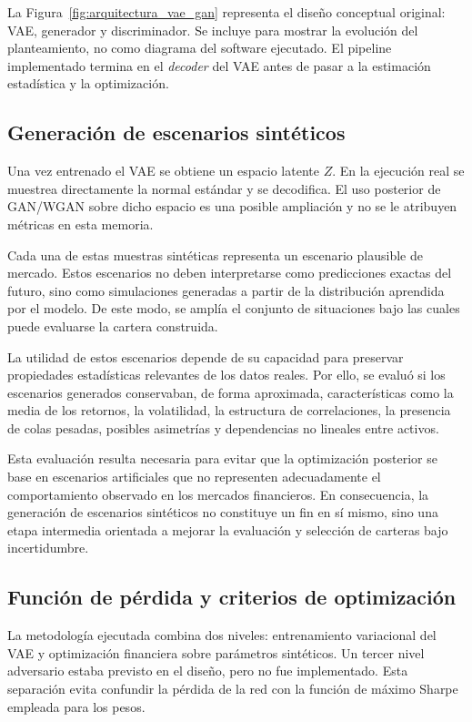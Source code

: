 La Figura~\ref{fig:arquitectura_vae_gan} representa el diseño conceptual original: VAE, generador y discriminador. Se incluye para mostrar la evolución del planteamiento, no como diagrama del software ejecutado. El pipeline implementado termina en el \textit{decoder} del VAE antes de pasar a la estimación estadística y la optimización.

\subsection{Generación de escenarios sintéticos}

Una vez entrenado el VAE se obtiene un espacio latente $Z$. En la ejecución real se muestrea directamente la normal estándar y se decodifica. El uso posterior de GAN/WGAN sobre dicho espacio es una posible ampliación y no se le atribuyen métricas en esta memoria.

Cada una de estas muestras sintéticas representa un escenario plausible de mercado. Estos escenarios no deben interpretarse como predicciones exactas del futuro, sino como simulaciones generadas a partir de la distribución aprendida por el modelo. De este modo, se amplía el conjunto de situaciones bajo las cuales puede evaluarse la cartera construida.

La utilidad de estos escenarios depende de su capacidad para preservar propiedades estadísticas relevantes de los datos reales. Por ello, se evaluó si los escenarios generados conservaban, de forma aproximada, características como la media de los retornos, la volatilidad, la estructura de correlaciones, la presencia de colas pesadas, posibles asimetrías y dependencias no lineales entre activos.

Esta evaluación resulta necesaria para evitar que la optimización posterior se base en escenarios artificiales que no representen adecuadamente el comportamiento observado en los mercados financieros. En consecuencia, la generación de escenarios sintéticos no constituye un fin en sí mismo, sino una etapa intermedia orientada a mejorar la evaluación y selección de carteras bajo incertidumbre.

\subsection{Función de pérdida y criterios de optimización}

La metodología ejecutada combina dos niveles: entrenamiento variacional del VAE y optimización financiera sobre parámetros sintéticos. Un tercer nivel adversario estaba previsto en el diseño, pero no fue implementado. Esta separación evita confundir la pérdida de la red con la función de máximo Sharpe empleada para los pesos.

